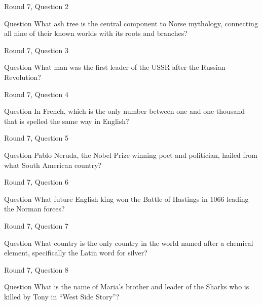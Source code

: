 \documentclass[11pt]{beamer}
\begin{document}
\begin{frame}{Round 7, Question 2}
\begin{block}{Question}
What ash tree is the central component to Norse mythology, connecting all nine of their known worlds with its roots and branches\@?
\end{block}
\end{frame}
    

\begin{frame}{Round 7, Question 3}
\begin{block}{Question}
What man was the first leader of the USSR after the Russian Revolution\@?
\end{block}
\end{frame}
    

\begin{frame}{Round 7, Question 4}
\begin{block}{Question}
In French, which is the only number between one and one thousand that is spelled the same way in English\@?
\end{block}
\end{frame}
    

\begin{frame}{Round 7, Question 5}
\begin{block}{Question}
Pablo Neruda, the Nobel Prize-winning poet and politician, hailed from what South American country\@?
\end{block}
\end{frame}
    

\begin{frame}{Round 7, Question 6}
\begin{block}{Question}
What future English king won the Battle of Hastings in 1066 leading the Norman forces\@?
\end{block}
\end{frame}
    

\begin{frame}{Round 7, Question 7}
\begin{block}{Question}
What country is the only country in the world named after a chemical element, specifically the Latin word for silver\@?
\end{block}
\end{frame}
    

\begin{frame}{Round 7, Question 8}
\begin{block}{Question}
What is the name of Maria's brother and leader of the Sharks who is killed by Tony in ``West Side Story''\@?
\end{block}
\end{frame}
    
\end{document}
